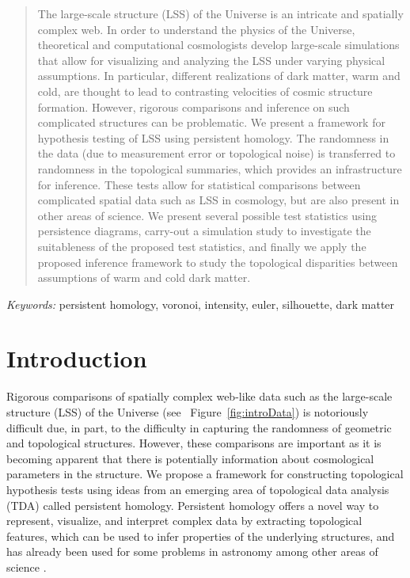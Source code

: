 \documentclass[12pt]{article}
\newcommand{\figref}[1]{Figure~\ref{#1}}
\begin{document}
\bigskip
\begin{abstract}
The large-scale structure (LSS) of the Universe is an intricate and spatially complex web. In order to understand the physics of the Universe, theoretical and computational cosmologists develop large-scale simulations that allow for visualizing and analyzing the LSS under varying physical assumptions. In particular, different realizations of dark matter, warm and cold, are thought to lead to contrasting velocities of cosmic structure formation. However, rigorous comparisons and inference on such complicated structures can be problematic.  We present a framework for hypothesis testing of LSS using persistent homology. The randomness in the data (due to measurement error or topological noise) is transferred to randomness in the topological summaries, which provides an infrastructure for inference. These tests allow for statistical comparisons between complicated spatial data such as LSS in cosmology, but are also present in other areas of science. We present several possible test statistics using persistence diagrams, carry-out a simulation study to investigate the suitableness of the proposed test statistics, and finally we apply the proposed inference framework to study the topological disparities between assumptions of warm and cold dark matter.
\end{abstract}

\noindent%
{\it Keywords:} persistent homology, voronoi, intensity, euler, silhouette, dark matter
\vfill


\newpage
{} %
\section{Introduction}
\label{sec:intro}

Rigorous comparisons of spatially complex web-like data such as the large-scale structure (LSS) of the Universe (see ~\figref{fig:introData}) is notoriously difficult due, in part, to the difficulty in capturing the randomness of geometric and topological structures.  However, these comparisons are important as it is becoming apparent that there is potentially information about cosmological parameters in the structure. We propose a framework for constructing topological hypothesis tests using ideas from an emerging area of topological data analysis (TDA) called persistent homology. Persistent homology offers a novel way to represent, visualize, and interpret complex data by extracting topological features, which can be used to infer properties of the underlying structures, and has already been used for some problems in astronomy \citep{Sousbie2011, SousbieEtAl2011, van2011alpha,cisewski2014non} among other areas of science \citep{bendich2014persistent, duong2012closed}.
\end{document}

